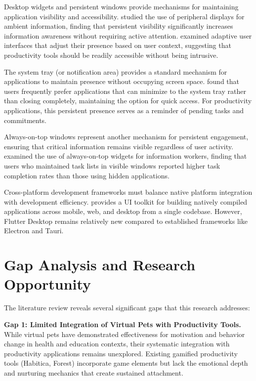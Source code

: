 Desktop widgets and persistent windows provide mechanisms for maintaining application visibility and accessibility. \citet{mackay1999reconfiguring} studied the use of peripheral displays for ambient information, finding that persistent visibility significantly increases information awareness without requiring active attention. \citet{mcgrenere2002adapting} examined adaptive user interfaces that adjust their presence based on user context, suggesting that productivity tools should be readily accessible without being intrusive.

The system tray (or notification area) provides a standard mechanism for applications to maintain presence without occupying screen space. \citet{mcgrenere2002adapting} found that users frequently prefer applications that can minimize to the system tray rather than closing completely, maintaining the option for quick access. For productivity applications, this persistent presence serves as a reminder of pending tasks and commitments.

Always-on-top windows represent another mechanism for persistent engagement, ensuring that critical information remains visible regardless of user activity. \citet{hutchings2006snip} examined the use of always-on-top widgets for information workers, finding that users who maintained task lists in visible windows reported higher task completion rates than those using hidden applications.

Cross-platform development frameworks must balance native platform integration with development efficiency. \citet{flutter2023documentation} provides a UI toolkit for building natively compiled applications across mobile, web, and desktop from a single codebase. However, Flutter Desktop remains relatively new compared to established frameworks like Electron and Tauri.

\section{Gap Analysis and Research Opportunity}
\label{sec:gap-analysis}

\completed

The literature review reveals several significant gaps that this research addresses:

\textbf{Gap 1: Limited Integration of Virtual Pets with Productivity Tools.} While virtual pets have demonstrated effectiveness for motivation and behavior change in health and education contexts, their systematic integration with productivity applications remains unexplored. Existing gamified productivity tools (Habitica, Forest) incorporate game elements but lack the emotional depth and nurturing mechanics that create sustained attachment.

